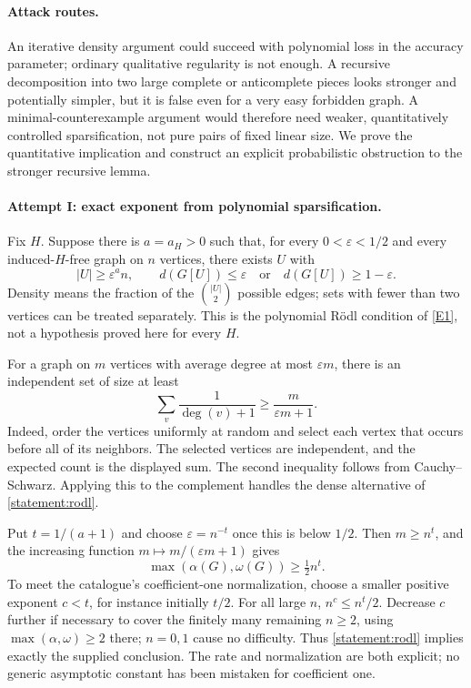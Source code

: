 \documentclass[11pt,a4paper]{article}
\newcommand{\eref}[2]{\hyperlink{extra:#1:#2}{[E#2]}}
\numberwithin{equation}{section}
\begin{document}
\paragraph{Attack routes.}
An iterative density argument could succeed with polynomial loss in the
accuracy parameter; ordinary qualitative regularity is not enough.
A recursive decomposition into two large complete or anticomplete
pieces looks stronger and potentially simpler, but it is false even
for a very easy forbidden graph.  A minimal-counterexample argument
would therefore need weaker, quantitatively controlled sparsification,
not pure pairs of fixed linear size.  We prove the quantitative
implication and construct an explicit probabilistic obstruction to the
stronger recursive lemma.

\paragraph{Attempt I: exact exponent from polynomial sparsification.}
Fix $H$.  Suppose there is $a=a_H>0$ such that, for every
$0<\varepsilon<1/2$ and every induced-$H$-free graph on $n$ vertices,
there exists $U$ with
\begin{equation}\label{statement:rodl}
 |U|\geq\varepsilon^a n,\qquad
 d(G[U])\leq\varepsilon\quad\text{or}\quad
 d(G[U])\geq1-\varepsilon.
\end{equation}
Density means the fraction of the $\binom{|U|}{2}$ possible edges;
sets with fewer than two vertices can be treated separately.
This is the polynomial R\"odl condition of \eref{statement}{1}, not a
hypothesis proved here for every $H$.

For a graph on $m$ vertices with average degree at most $\varepsilon m$,
there is an independent set of size at least
\begin{equation}\label{statement:caro}
 \sum_{v}\frac1{\deg(v)+1}\geq\frac{m}{\varepsilon m+1}.
\end{equation}
Indeed, order the vertices uniformly at random and select each vertex
that occurs before all of its neighbors.  The selected vertices are
independent, and the expected count is the displayed sum.  The second
inequality follows from Cauchy--Schwarz.  Applying this to the complement
handles the dense alternative of \eqref{statement:rodl}.

Put $t=1/(a+1)$ and choose $\varepsilon=n^{-t}$ once this is below
$1/2$.  Then $m\geq n^t$, and the increasing function
$m\mapsto m/(\varepsilon m+1)$ gives
\[
 \max(\alpha(G),\omega(G))\geq\tfrac12n^t.
\]
To meet the catalogue's coefficient-one normalization, choose a smaller
positive exponent $c<t$, for instance initially $t/2$.  For all large
$n$, $n^c\leq n^t/2$.  Decrease $c$ further if necessary to cover the
finitely many remaining $n\geq2$, using
$\max(\alpha,\omega)\geq2$ there; $n=0,1$ cause no difficulty.
Thus \eqref{statement:rodl} implies exactly the supplied conclusion.
The rate and normalization are both explicit; no generic asymptotic
constant has been mistaken for coefficient one.
\end{document}
